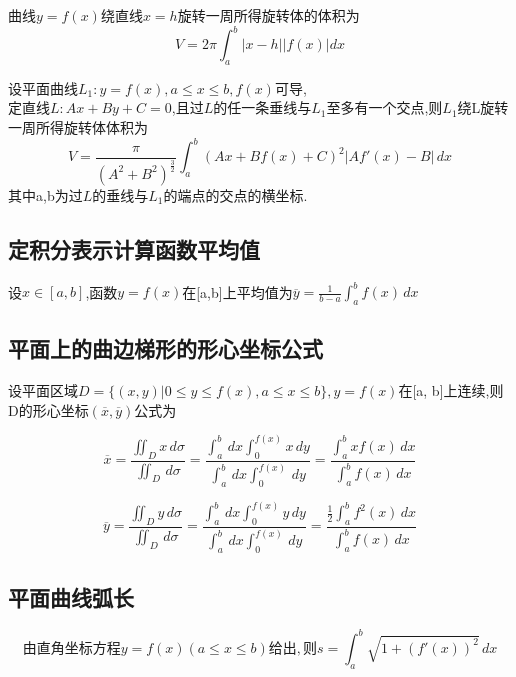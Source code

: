 曲线\(y = f(x)\)绕直线\(x = h\)旋转一周所得旋转体的体积为\[V = 2\pi\int_a^b|x - h||f(x)|dx\]

设平面曲线\(L_1 : y = f(x), a \leq x \leq b, f(x)\)可导, \\
定直线\(L : Ax + By + C = 0\),且过\(L\)的任一条垂线与\(L_1\)至多有一个交点,则\(L_1\)绕L旋转一周所得旋转体体积为
\begin{displaymath}
V = \frac{\pi}{(A^2 + B^2)^{\frac{3}{2}}}
\int_{a}^{b} (Ax + Bf(x) + C)^2 \lvert Af'(x) - B \rvert \,dx
\end{displaymath}
其中a,b为过\(L\)的垂线与\(L_1\)的端点的交点的横坐标.


\subsection{定积分表示计算函数平均值}

设\(x \in [a, b]\),函数\(y = f(x)\)在[a,b]上平均值为\(\overline{y} = \frac{1}{b- a} \int_{a}^{b} f(x) \,dx\)


\subsection{平面上的曲边梯形的形心坐标公式}

设平面区域\(D = \{ (x, y) | 0 \leq y \leq f(x), a \leq x \leq b \}, y = f(x)\)在[a, b]上连续,则D的形心坐标\((\overline{x}, \overline{y})\)公式为

\begin{displaymath}
\overline{x} = \frac{\iint_{D} x \,d\sigma}{\iint_{D} \,d\sigma} = 
\frac{\int_{a}^{b} \,dx \int_{0}^{f(x)} x \,dy}{\int_{a}^{b} \,dx \int_{0}^{f(x)} \,dy} =
\frac{\int_{a}^{b} xf(x) \,dx}{\int_{a}^{b} f(x) \,dx}
\end{displaymath}

\begin{displaymath}
\overline{y} = \frac{\iint_{D} y \,d\sigma}{\iint_{D} \,d\sigma} = 
\frac{\int_{a}^{b} \,dx \int_{0}^{f(x)} y \,dy}{\int_{a}^{b} \,dx \int_{0}^{f(x)} \,dy} =
\frac{\frac{1}{2}\int_{a}^{b} f^2(x) \,dx}{\int_{a}^{b} f(x) \,dx}
\end{displaymath}


\subsection{平面曲线弧长}

\begin{displaymath}
由直角坐标方程y = f(x)(a \leq x \leq b)给出,
则s = \int_{a}^{b} \sqrt{1 + (f'(x))^2} \,dx
\end{displaymath}

